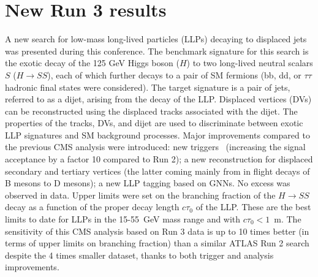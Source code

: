 \documentclass{moriond}
\begin{document}
\section{New Run 3 results} \label{sec:run3}

A new search for low-mass long-lived particles (LLPs) decaying to displaced
jets~\cite{CMS-PAS-EXO-23-013} was presented during this conference.
The benchmark signature for this search is the exotic decay of the 125
GeV Higgs boson ($H$) to two long-lived neutral scalars $S$ ($H
\rightarrow SS$), each of which further decays to a pair of SM fermions (bb, dd, or $\tau\tau$
hadronic final states were considered).  The target signature is a pair of jets, referred to as a
dijet, arising from the decay of the LLP. Displaced vertices (DVs) can be reconstructed using
the displaced tracks associated with the dijet. The properties of the tracks, DVs, and dijet are
used to discriminate between exotic LLP signatures and SM background
processes. Major improvements compared to the previous CMS analysis
were introduced: new triggers~\cite{CMS-DP-2023-043} (increasing the signal acceptance by a
factor 10 compared to Run 2); a new reconstruction for
displaced secondary and tertiary vertices (the latter coming mainly
from in flight decays of B mesons to D mesons); a new LLP tagging
based on GNNs. No excess was observed in data. Upper limits were set
on the branching fraction of the $H \rightarrow SS$ decay as a function
of the proper decay length $c\tau_{0}$ of the LLP. These are the best limits to date for LLPs
in the 15-55~GeV mass range and with $c\tau_{0}<1$~m.
The sensitivity of this CMS analysis based on Run 3 data is up to 10 times better (in terms
of upper limits on branching fraction) than a similar ATLAS Run 2 search
despite the 4 times smaller dataset, thanks to both trigger and analysis improvements.
\end{document}
